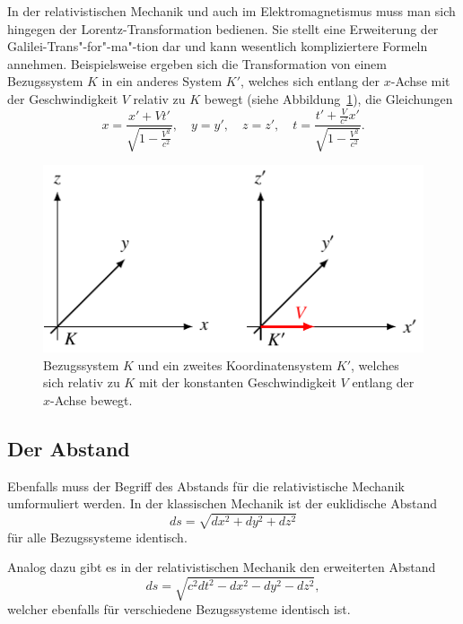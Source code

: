 In der relativistischen Mechanik und auch im Elektromagnetismus
muss man sich hingegen der Lorentz-Transformation bedienen.
Sie stellt eine Erweiterung der Galilei-Trans"-for"-ma"-tion dar
und kann wesentlich kompliziertere Formeln annehmen.
Beispielsweise ergeben sich die Transformation von einem
Bezugssystem \(K\) in ein anderes System \(K'\),
welches sich entlang der \(x\)-Achse mit der Geschwindigkeit \(V\)
relativ zu \(K\) bewegt (siehe Abbildung~\ref{relativ:fig:lorentz-trafo-koords}),
die Gleichungen
\begin{equation}
    x = \frac{x' + V t'}{\sqrt{1 - \frac{V^2}{c^2}}}, \quad
    y = y', \quad
    z = z', \quad
    t = \frac{t' + \frac{V}{c^2}x'}{\sqrt{1-\frac{V^2}{c^2}}}.
    \label{relativ:eqn:lorentz-trafo-beisp}
\end{equation}
\begin{figure}
    \centering
    \includegraphics{papers/relativ/tikz/lorentz-trafo-koord.pdf}
    \caption{Bezugssystem \(K\) und ein zweites Koordinatensystem \(K'\),
    welches sich relativ zu \(K\) mit der konstanten Geschwindigkeit \(V\)
    entlang der \(x\)-Achse bewegt.
    \label{relativ:fig:lorentz-trafo-koords}}
\end{figure}

\subsection{Der Abstand 
\label{relativ:section:abstand}}

Ebenfalls muss der Begriff des Abstands für die relativistische Mechanik umformuliert werden.
In der klassischen Mechanik ist der euklidische Abstand
\begin{equation}
    ds=\sqrt{dx^2 + dy^2 + dz^2}
    \label{relativ:eqn:abstand-klass}
\end{equation}
für alle Bezugssysteme identisch.

Analog dazu gibt es in der relativistischen Mechanik den erweiterten Abstand
\begin{equation}
    ds = \sqrt{c^2dt^2 - dx^2 - dy^2 - dz^2},
    \label{relativ:eqn:abstand-relativ}
\end{equation}
welcher ebenfalls für verschiedene Bezugssysteme identisch ist.


